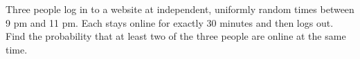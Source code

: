 Three people log in to a website at independent, uniformly random times between 9 pm and 11 pm. Each stays online for exactly $30$ minutes and then logs out. Find the probability that at least two of the three people are online at the same time.
